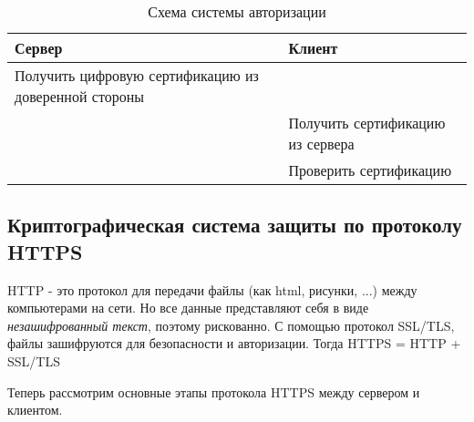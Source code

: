 \begin{table}[ht]
    \caption{Схема системы авторизации}
	\centering
	\begin{tabularx}{\textwidth}{
			| >{\centering\arraybackslash}X |
			| >{\centering\arraybackslash}X |
		}
		\hline
		\textbf{Сервер} & \textbf{Клиент} \\
		\hline
		Получить цифровую сертификацию из доверенной стороны & \\
		\hline
		& Получить сертификацию из сервера \\
		\hline
		& Проверить сертификацию \\
		\hline
	\end{tabularx}
	
\end{table}

\subsection{Криптографическая система защиты по протоколу HTTPS}

HTTP - это протокол для передачи файлы (как html, рисунки, ...) между компьютерами на сети. Но все данные представляют себя в виде \textit{незашифрованный текст}, поэтому рискованно. С помощью протокол SSL/TLS, файлы зашифруются для безопасности и авторизации. Тогда HTTPS = HTTP + SSL/TLS

Теперь рассмотрим основные этапы протокола HTTPS между сервером и клиентом.

